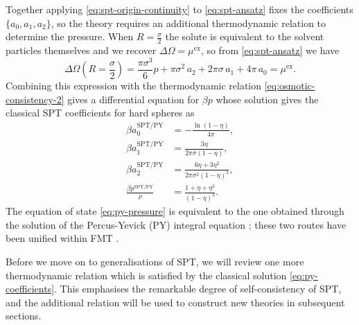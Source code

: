 \documentclass[11pt,twoside]{report}
\begin{document}
Together applying \eqref{eq:spt-origin-continuity} to \eqref{eq:spt-ansatz} fixes the coefficients $\{a_0, a_1, a_2\}$, so the theory requires an additional thermodynamic relation to determine the pressure.
When $R = \frac{\sigma}{2}$ the solute is equivalent to the solvent particles themselves and we recover $\Delta\Omega = \mu^\mathrm{ex}$, so from \eqref{eq:spt-ansatz} we have
\begin{equation}\label{eq:spt-mu}
  \Delta\Omega\left(R=\frac{\sigma}{2}\right) =
  \frac{\pi \sigma^3}{6} p
  + \pi \sigma^2 \, a_2
  + 2 \pi \sigma \, a_1
  + 4\pi \, a_0
  =
  \mu^\mathrm{ex}.
\end{equation}
Combining this expression with the thermodynamic relation \eqref{eq:osmotic-consistency-2} gives a differential equation for $\beta p$ whose solution gives the classical SPT coefficients for hard spheres as \cite{ReissJCP1959,LebowitzJCP1965}
\begin{subequations}\label{eq:py-coefficients}
  \begin{align}
    \beta a_0^\mathrm{SPT/PY}
    &=
    -\frac{\ln{(1- \eta)}}{4\pi}, \\
    \beta a_1^\mathrm{SPT/PY}
    &=
    \frac{3\eta}{2\pi \sigma (1- \eta)},
    \\
    \beta a_2^\mathrm{SPT/PY}
    &=
    \frac{6\eta + 3\eta^2}{2\pi \sigma^2 (1- \eta)^2},
    \\
    \frac{\beta p^\mathrm{SPT/PY}}{\rho}
    &=
    \frac{1 + \eta + \eta^2}{(1 - \eta)^3}.
    \label{eq:py-pressure}
 \end{align}
\end{subequations}
The equation of state \eqref{eq:py-pressure} is equivalent to the one obtained through the solution of the Percus-Yevick (PY) integral equation \cite{WertheimPRL1963}; these two routes have been unified within FMT \cite{RosenfeldPRL1989}.

Before we move on to generalisations of SPT, we will review one more thermodynamic relation which is satisfied by the classical solution \eqref{eq:py-coefficients}.
This emphasises the remarkable degree of self-consistency of SPT, and the additional relation will be used to construct new theories in subsequent sections.
\end{document}
